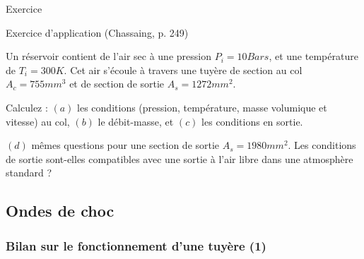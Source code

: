 \begin{frame}{Exercice}

Exercice d'application (Chassaing, p. 249)

\medskip
Un réservoir contient de l'air sec à une pression $P_i= 10 Bars$, et une température de $T_i = 300K$.
Cet air s'écoule à travers une tuyère de section au col $A_c = 755 mm^3$ et de section de sortie $A_s = 1272 mm^2$.

\medskip


Calculez : $(a)$ les conditions (pression, température, masse volumique et vitesse) au col,
 $(b)$ le débit-masse,
 et $(c)$  les conditions en sortie.


\medskip 
$(d)$ mêmes questions pour une section de sortie $A_s = 1980 mm^2$. Les conditions de sortie sont-elles compatibles avec une sortie à l'air libre dans une atmosphère standard ?


 



\end{frame}

\subsection{Ondes de choc}

\subsubsection{Bilan sur le fonctionnement d'une tuyère (1)}

